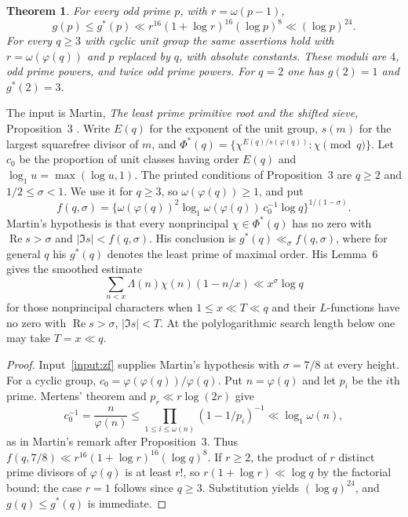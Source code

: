 \documentclass[11pt]{article}
\newtheorem{theorem}{Theorem}[section]
\theoremstyle{definition}
\newcommand{\ph}{\varphi}
\DeclareMathOperator{\Rea}{Re}
\begin{document}
\begin{theorem}\label{thm:primitive}
For every odd prime $p$, with $r=\omega(p-1)$,
\begin{equation}\label{eq:primitive}
 g(p)\le g^*(p)\ll
 r^{16}(1+\log r)^{16}(\log p)^8\ll(\log p)^{24}.
\end{equation}
For every $q\ge3$ with cyclic unit group the same assertions hold with
$r=\omega(\ph(q))$ and $p$ replaced by $q$, with absolute constants.
These moduli are $4$, odd prime powers, and twice odd prime powers.
For $q=2$ one has $g(2)=1$ and $g^*(2)=3$.
\end{theorem}

The input is Martin, \emph{The least prime primitive root and the
shifted sieve}, Proposition~3 \cite{Martin1997}.
Write $E(q)$ for the exponent of the unit group, $s(m)$ for the
largest squarefree divisor of $m$, and
$\Phi^*(q)=\{\chi^{E(q)/s(\ph(q))}:\chi\pmod q\}$.
Let $c_0$ be the proportion of unit classes having order $E(q)$ and
$\log_1 u=\max(\log u,1)$.
The printed conditions of Proposition~3 are $q\ge2$ and
$1/2\le\sigma<1$. We use it for $q\ge3$, so
$\omega(\ph(q))\ge1$, and put
\[
 f(q,\sigma)=
 \{\omega(\ph(q))^2\log_1\omega(\ph(q))\,c_0^{-1}\log q\}^{1/(1-\sigma)}.
\]
Martin's hypothesis is that every nonprincipal $\chi\in\Phi^*(q)$
has no zero with $\Rea s>\sigma$ and $|\Im s|<f(q,\sigma)$.
His conclusion is $g^*(q)\ll_\sigma f(q,\sigma)$, where for general
$q$ his $g^*(q)$ denotes the least prime of maximal order.
His Lemma~6 gives the smoothed estimate
\[
 \sum_{n<x}\Lambda(n)\chi(n)(1-n/x)\ll x^\sigma\log q
\]
for those nonprincipal characters when $1\le x\ll T\ll q$ and
their $L$-functions have no zero with $\Rea s>\sigma$, $|\Im s|<T$.
At the polylogarithmic search length below one may take $T=x\ll q$.

\begin{proof}
Input~\ref{input:zf} supplies Martin's hypothesis with $\sigma=7/8$
at every height. For a cyclic group,
$c_0=\ph(\ph(q))/\ph(q)$. Put $n=\ph(q)$ and let $p_i$ be the
$i$th prime. Mertens' theorem and $p_r\ll r\log(2r)$ give
\[
 c_0^{-1}=\frac n{\ph(n)}
 \le\prod_{1\le i\le\omega(n)}(1-1/p_i)^{-1}
 \ll\log_1\omega(n),
\]
as in Martin's remark after Proposition~3. Thus
$f(q,7/8)\ll r^{16}(1+\log r)^{16}(\log q)^8$.
If $r\ge2$, the product of $r$ distinct prime divisors of $\ph(q)$
is at least $r!$, so $r(1+\log r)\ll\log q$ by the factorial bound;
the case $r=1$ follows since $q\ge3$.
Substitution yields $(\log q)^{24}$, and $g(q)\le g^*(q)$ is immediate.
\end{proof}
\end{document}
